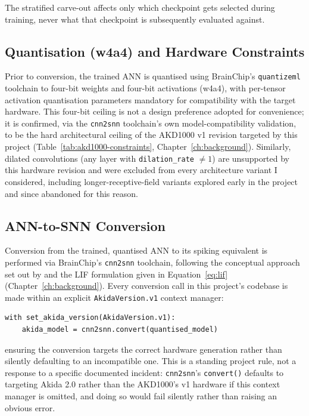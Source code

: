 \noindent The stratified carve-out affects only which checkpoint gets selected during training, never what that checkpoint is subsequently evaluated against.

\subsection{Quantisation (w4a4) and Hardware Constraints}

Prior to conversion, the trained ANN is quantised using BrainChip's \texttt{quantizeml} toolchain to four-bit weights and four-bit activations (w4a4), with per-tensor activation quantisation parameters mandatory for compatibility with the target hardware. This four-bit ceiling is not a design preference adopted for convenience; it is confirmed, via the \texttt{cnn2snn} toolchain's own model-compatibility validation, to be the hard architectural ceiling of the AKD1000 v1 revision targeted by this project (Table~\ref{tab:akd1000-constraints}, Chapter~\ref{ch:background}). Similarly, dilated convolutions (any layer with \texttt{dilation\_rate} $\neq 1$) are unsupported by this hardware revision and were excluded from every architecture variant I considered, including longer-receptive-field variants explored early in the project and since abandoned for this reason.

\subsection{ANN-to-SNN Conversion}

Conversion from the trained, quantised ANN to its spiking equivalent is performed via BrainChip's \texttt{cnn2snn} toolchain, following the conceptual approach set out by 
\citet{rueckauer2017} and the LIF formulation given in Equation~\ref{eq:lif} (Chapter~\ref{ch:background}). Every conversion call in this project's codebase is made within an 
explicit \texttt{AkidaVersion.v1} context manager:

\begin{verbatim}
with set_akida_version(AkidaVersion.v1):
    akida_model = cnn2snn.convert(quantised_model)
\end{verbatim}

\noindent ensuring the conversion targets the correct hardware generation rather than silently defaulting to an incompatible one. 
This is a standing project rule, not a response to a specific documented incident: \texttt{cnn2snn}'s \texttt{convert()} defaults to 
targeting Akida 2.0 rather than the AKD1000's v1 hardware if this context manager is omitted, and doing so would fail silently rather than raising an obvious error.

